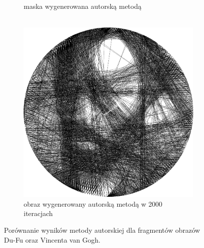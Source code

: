 \begin{figure}[H]
\begin{subfigure}{0.24\textwidth}
            \caption{maska wygenerowana autorską metodą\\\hphantom{ }\\\hphantom{ }}
            \label{comp-comp-dufu-gogh-g}
        \end{subfigure}
        \begin{subfigure}{0.24\textwidth}
            \centering
            \includegraphics[width = \textwidth]{img/6-comp/gogh_e_i2000_c20_inv0_bg10_obj1_ed1.png}
            \caption{obraz wygenerowany autorską metodą w 2000 iteracjach\\\hphantom{ }}
            \label{comp-comp-dufu-gogh-h}
        \end{subfigure}
        \caption{Porównanie wyników metody autorskiej dla fragmentów obrazów Du-Fu oraz Vincenta van Gogh.}
        \label{comp-comp-dufu-gogh}
        \end{figure}
        
